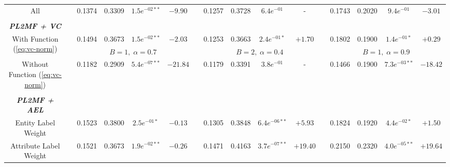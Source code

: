 \begin{table*}
{\begin{tabular}{cc@{\hs}rrccc@{\hs}rrccc@{\hs}rrcc}
{\raggedright All} & \phantom{a} & 0.1374 & 0.3309 & $1.5e^{-02**}$ & $-9.90$
                   & \phantom{a} & 0.1257 & 0.3728 & $6.4e^{-01}$ & -
                   & \phantom{a} & 0.1743 & 0.2020 & $9.4e^{-01}$ & $-3.01$
       \\
\\
\emph{\textbf{PL2MF + VC}} & \multicolumn{15}{c}{\phantom{a}} \\
\multirow{2}{*}{{\raggedright With Function (\ref{eq:vc-norm})}} & \phantom{a} & 0.1494 & 0.3673 & $1.5e^{-02**}$ & $-2.03$
                                                & \phantom{a} & 0.1253 & 0.3663 & $2.4e^{-01*}$ & $+1.70$
                                                & \phantom{a} & 0.1802 & 0.1900 & $1.4e^{-01*}$ & $+0.29$ \\%
 & \phantom{a} & \multicolumn{4}{c}{$B=1,\;\alpha=0.7$}
   & \phantom{a} & \multicolumn{4}{c}{$B=2,\;\alpha=0.4$}
   & \phantom{a} & \multicolumn{4}{c}{$B=1,\;\alpha=0.9$} \\
{\raggedright Without Function (\ref{eq:vc-norm})} & \phantom{a} & 0.1182 & 0.2909 & $5.4e^{-07**}$ & $-21.84$
                                                   & \phantom{a} & 0.1179 & 0.3391 & $3.8e^{-01}$ & -
                                                   & \phantom{a} & 0.1466 & 0.1900 & $7.3e^{-03**}$ & $-18.42$
                                       \\
\\
\emph{\textbf{PL2MF + AEL}} & \multicolumn{15}{c}{\phantom{a}} \\
{\raggedright Entity Label Weight} & \phantom{a} & 0.1523 & 0.3800 & $2.5e^{-01*}$ & $-0.13$
                                   & \phantom{a} & 0.1305 & 0.3848 & $6.4e^{-06**}$ & $+5.93$
                                   & \phantom{a} & 0.1824 & 0.1920 & $4.4e^{-02*}$ & $+1.50$
                       \\
{\raggedright Attribute Label Weight} & \phantom{a} & 0.1521 & 0.3673 & $1.9e^{-02**}$ & $-0.26$
                                      & \phantom{a} & 0.1471 & 0.4163 & $3.7e^{-07**}$ & $+19.40$
                                      & \phantom{a} & 0.2150 & 0.2320 & $4.0e^{-05**}$ & $+19.64$

\end{tabular}}
\end{table*}
